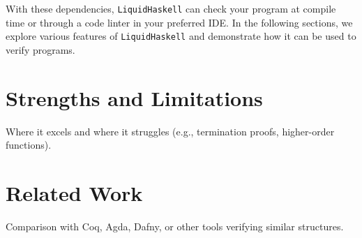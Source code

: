 With these dependencies, \texttt{LiquidHaskell} can check your program at compile time or through a code linter in your preferred IDE.
In the following sections, we explore various features of
\texttt{LiquidHaskell} and demonstrate how it can be used to
verify programs.




\section { Strengths and Limitations }
Where it excels and where it struggles (e.g., termination proofs, higher-order functions).
\section { Related Work }
Comparison with Coq, Agda, Dafny, or other tools verifying similar structures.
